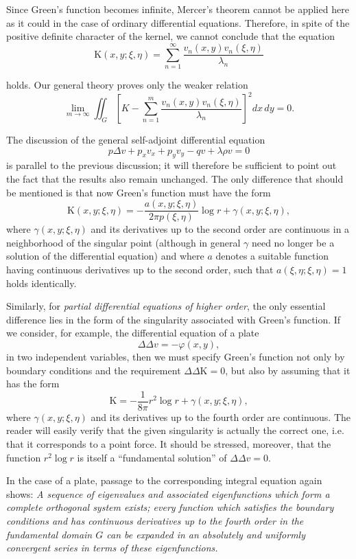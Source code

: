 Since Green's function becomes infinite, Mercer's theorem cannot be applied here as it could in the case of ordinary differential equations. Therefore, in spite of the positive definite character of the kernel, we cannot conclude that the equation
\[
\mathrm K(x,y;\xi,\eta)=\sum_{n=1}^{\infty}\frac{v_n(x,y)v_n(\xi,\eta)}{\lambda_n}
\]

holds. Our general theory proves only the weaker relation
\[
\lim_{m\to\infty}\iint_G\left[K-\sum_{n=1}^{m}\frac{v_n(x,y)v_n(\xi,\eta)}{\lambda_n}\right]^2dx\,dy=0.
\]

The discussion of the general self-adjoint differential equation
\[
p\Delta v+p_xv_x+p_yv_y-qv+\lambda\rho v=0
\]
is parallel to the previous discussion; it will therefore be sufficient to point out the fact that the results also remain unchanged. The only difference that should be mentioned is that now Green's function must have the form
\[
\mathrm K(x,y;\xi,\eta)=-\frac{a(x,y;\xi,\eta)}{2\pi p(\xi,\eta)}\log r+\gamma(x,y;\xi,\eta),
\]
where $\gamma(x,y;\xi,\eta)$ and its derivatives up to the second order are continuous in a neighborhood of the singular point (although in general $\gamma$ need no longer be a solution of the differential equation) and where $a$ denotes a suitable function having continuous derivatives up to the second order, such that $a(\xi,\eta;\xi,\eta)=1$ holds identically.

Similarly, for \emph{partial differential equations of higher order}, the only essential difference lies in the form of the singularity associated with Green's function. If we consider, for example, the differential equation of a plate
\[
\Delta\Delta v=-\varphi(x,y),
\]
in two independent variables, then we must specify Green's function not only by boundary conditions and the requirement $\Delta\Delta\mathrm K=0$, but also by assuming that it has the form
\[
\mathrm K=-\frac{1}{8\pi}r^2\log r+\gamma(x,y;\xi,\eta),
\]
where $\gamma(x,y;\xi,\eta)$ and its derivatives up to the fourth order are continuous. The reader will easily verify that the given singularity is actually the correct one, i.e. that it corresponds to a point force. It should be stressed, moreover, that the function $r^2\log r$ is itself a ``fundamental solution'' of $\Delta\Delta v=0$.

In the case of a plate, passage to the corresponding integral equation again shows: \emph{A sequence of eigenvalues and associated eigenfunctions which form a complete orthogonal system exists; every function which satisfies the boundary conditions and has continuous derivatives up to the fourth order in the fundamental domain $G$ can be expanded in an absolutely and uniformly convergent series in terms of these eigenfunctions.}


